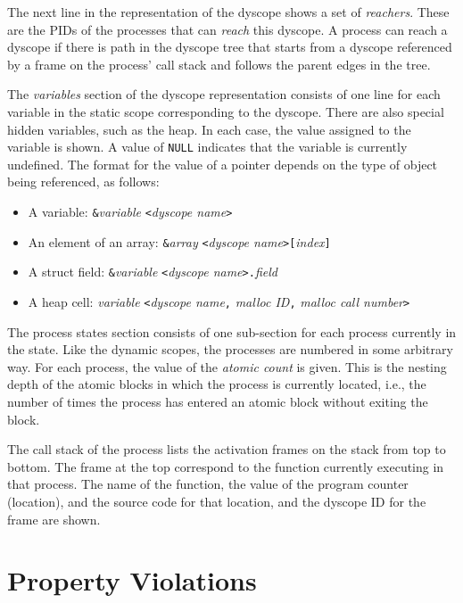 The next line in the representation of the dyscope shows a set of
\emph{reachers}.  These are the PIDs of the processes that can
\emph{reach} this dyscope.  A process can reach a dyscope if there is
path in the dyscope tree that starts from a dyscope referenced by a
frame on the process' call stack and follows the parent edges in the
tree.

The \emph{variables} section of the dyscope representation consists of
one line for each variable in the static scope corresponding to the
dyscope.  There are also special hidden variables, such as the heap.
In each case, the value assigned to the variable is shown.  A value of
\texttt{NULL} indicates that the variable is currently undefined.  The format for the
value of a pointer depends on the type of object being referenced, as 
follows:
\begin{itemize}
\item A variable: {\tt \&}\emph{variable} {\tt <}\emph{dyscope name}{\tt >}
\item An element of an array: {\tt \&}\emph{array} {\tt <}\emph{dyscope name}{\tt >[}\emph{index}{\tt]}
\item A struct field: {\tt \&}\emph{variable} {\tt <}\emph{dyscope name}{\tt >.}\emph{field}
\item A heap cell: \emph{variable} {\tt <}\emph{dyscope name}{\tt,} \emph{malloc ID}{\tt,} \emph{malloc call number}{\tt >}
\end{itemize}

The process states section consists of one sub-section for each
process currently in the state.  Like the dynamic scopes, the
processes are numbered in some arbitrary way. For each process, the
value of the \emph{atomic count} is given.  This is the nesting depth
of the atomic blocks in which the process is currently located, i.e.,
the number of times the process has entered an atomic block without
exiting the block.

The call stack of the process lists the activation frames on the stack
from top to bottom.  The frame at the top correspond to the function
currently executing in that process.  The name of the function, the
value of the program counter (location), and the source code for that
location, and the dyscope ID for the frame are shown.

\section{Property Violations}


